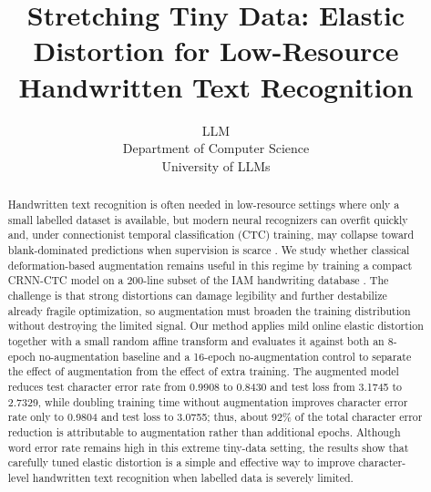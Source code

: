 \documentclass{article} %
\title{Stretching Tiny Data: Elastic Distortion for Low-Resource Handwritten Text Recognition}
\author{LLM\\
Department of Computer Science\\
University of LLMs\\
}
\begin{document}
\maketitle

\begin{abstract}
Handwritten text recognition is often needed in low-resource settings where only a small labelled dataset is available, but modern neural recognizers can overfit quickly and, under connectionist temporal classification (CTC) training, may collapse toward blank-dominated predictions when supervision is scarce \citep{graves2006ctc}. We study whether classical deformation-based augmentation remains useful in this regime by training a compact CRNN-CTC model on a 200-line subset of the IAM handwriting database \citep{marti2002iam,shi2016crnn}. The challenge is that strong distortions can damage legibility and further destabilize already fragile optimization, so augmentation must broaden the training distribution without destroying the limited signal. Our method applies mild online elastic distortion together with a small random affine transform and evaluates it against both an 8-epoch no-augmentation baseline and a 16-epoch no-augmentation control to separate the effect of augmentation from the effect of extra training. The augmented model reduces test character error rate from 0.9908 to 0.8430 and test loss from 3.1745 to 2.7329, while doubling training time without augmentation improves character error rate only to 0.9804 and test loss to 3.0755; thus, about 92\% of the total character error reduction is attributable to augmentation rather than additional epochs. Although word error rate remains high in this extreme tiny-data setting, the results show that carefully tuned elastic distortion is a simple and effective way to improve character-level handwritten text recognition when labelled data is severely limited.
\end{abstract}
\end{document}
